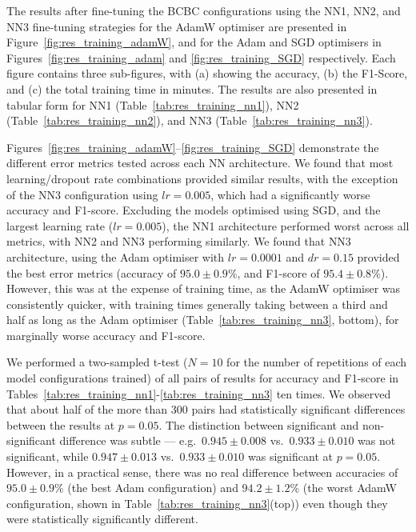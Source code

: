 \documentclass[a4paper,12pt]{article}
\begin{document}
The results after fine-tuning the \ac{BCBC} configurations using the \ac{NN1}, \ac{NN2}, and \ac{NN3} fine-tuning strategies for the AdamW optimiser are presented in Figure~\ref{fig:res_training_adamW}, and for the Adam and SGD optimisers in Figures~\ref{fig:res_training_adam} and \ref{fig:res_training_SGD} respectively. Each figure contains three sub-figures, with (a) showing the accuracy, (b) the F1-Score, and (c) the total training time in minutes.  The results are also presented in tabular form for \ac{NN1} (Table~\ref{tab:res_training_nn1}), \ac{NN2} (Table~\ref{tab:res_training_nn2}), and \ac{NN3} (Table~\ref{tab:res_training_nn3}).

Figures~\ref{fig:res_training_adamW}--\ref{fig:res_training_SGD} demonstrate the different error metrics tested across each \ac{NN} architecture. We found that most learning/dropout rate combinations provided similar 
results, with the exception of the \ac{NN3} configuration using $lr = 0.005$, which had a significantly worse accuracy and F1-score. Excluding the models optimised using SGD, and the largest learning rate ($lr = 0.005$), the \ac{NN1} architecture performed worst across all metrics, with \ac{NN2} and \ac{NN3} performing similarly. We found that \ac{NN3} architecture, using the Adam optimiser with $lr = 0.0001$ and $dr = 0.15$ provided the best error metrics (accuracy of $95.0 \pm 0.9 \%$, and F1-score of $95.4 \pm 0.8\%$). However, this was at the expense of training time, as the AdamW optimiser was consistently quicker, with training times generally taking between a third and half as long as the Adam optimiser (Table~\ref{tab:res_training_nn3}, bottom), for marginally worse accuracy and F1-score. 


We performed a two-sampled t-test ($N=10$ for the number of repetitions of each model configurations trained) of all pairs of results for accuracy and F1-score in Tables~\ref{tab:res_training_nn1}-\ref{tab:res_training_nn3} ten times. We observed that about half of the more than 300 pairs had statistically significant differences between the results at $p = 0.05$. The distinction between significant and non-significant difference was subtle --- e.g.\ $0.945 \pm 0.008$ vs.\ $0.933 \pm 0.010$ was not significant, while $0.947 \pm 0.013$ vs.\ $0.933 \pm 0.010$ was significant at $p = 0.05$. 
However, in a practical sense, there was no real difference between accuracies of $95.0 \pm 0.9\%$ (the best Adam configuration) and $94.2 \pm 1.2\%$ (the worst AdamW configuration, shown in Table~\ref{tab:res_training_nn3}(top)) even though they were statistically significantly different. 
\end{document}
